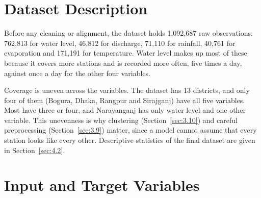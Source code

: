\section{Dataset Description}
\label{sec:3.7}




Before any cleaning or alignment, the dataset holds 1,092,687 raw observations:
762,813 for water level, 46,812 for discharge, 71,110 for rainfall, 40,761 for
evaporation and 171,191 for temperature.
Water level makes up most of these because it covers more stations and is
recorded more often, five times a day, against once a day for the other four
variables.

Coverage is uneven across the variables. The dataset has 13 districts, and only
four of them (Bogura, Dhaka, Rangpur and Sirajganj) have all five variables.
Most have three or four, and Narayanganj has only water level and one other
variable. This unevenness is why clustering (Section~\ref{sec:3.10}) and careful
preprocessing (Section~\ref{sec:3.9}) matter, since a model cannot assume that
every station looks like every other. Descriptive statistics of the final
dataset are given in Section~\ref{sec:4.2}.

\section{Input and Target Variables}
\label{sec:3.8}

